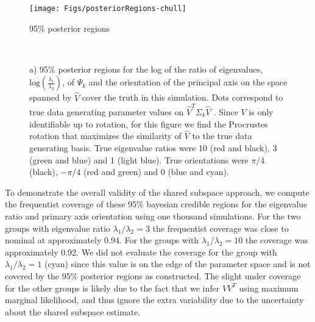 \documentclass[12pt]{article}
\begin{document}
\begin{figure}[t]
    \centering
    \texttt{[image: Figs/posteriorRegions-chull]}
        \caption{95\% posterior regions}
        \label{fig:simPosterior}
    ~ %
    \caption{a) 95\% posterior regions for the log of the ratio of
      eigenvalues, $\text{log}(\frac{\lambda_1}{\lambda_2})$, of $\Psi_k$ and the
      orientation of the principal axis on the space spanned by $\hat{V}$
      cover the truth in this simulation.  Dots correspond to true data generating
      parameter values on $\hat{V}^T\Sigma_k\hat{V}$ .  Since $V$
      is only identifiable up to rotation, for this figure we find the Procrustes
      rotation that maximizes the similarity of $\hat{V}$ to the true
      data generating basis. True eigenvalue ratios were 10 (red and
      black), 3 (green and blue) and 1 (light blue).  True
      orientations were $\pi/4$ (black), $-\pi/4$ (red and green) and
      0 (blue and cyan). %
    }
\end{figure}

To demonstrate the overall validity of the shared subspace approach,
we compute the frequentist coverage of these 95\% bayesian credible
regions for the eigenvalue ratio and primary axis orientation using
one thousand simulations.  For the two groups with eigenvalue ratio
$\lambda_1/\lambda_2 = 3$ the frequentist coverage was close to
nominal at approximately 0.94.  For the groups with
$\lambda_1/\lambda_2 = 10$ the coverage was approximately 0.92.  We
did not evaluate the coverage for the group with
$\lambda_1/\lambda_2 = 1$ (cyan) since this value is on the edge of the
parameter space and is not covered by the 95\% posterior regions
as constructed.  The slight under coverage for the other groups is likely due to the fact
that we infer $VV^T$ using maximum marginal likelihood, and thus
ignore the extra variability due to the uncertainty about the shared
subspace estimate.
\end{document}
